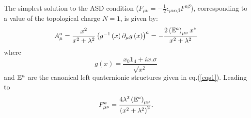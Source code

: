 \documentclass[a4paper,12pt]{book}
\begin{document}
The simplest solution to the ASD condition ($F_{\mu \nu }=-\frac{1}{2}%
\epsilon _{\mu \nu \alpha \beta }F^{\alpha \beta }$), corresponding to a
value of the topological charge $N=1$, \cite{bpst}\cite{hooft1} is given by: 
\begin{equation}
A_{\mu }^{a}=\frac{x^{2}}{x^{2}+\lambda ^{2}}\left( g^{-1}\left( x\right)
\partial _{\mu }g\left( x\right) \right) ^{a}=-\frac{2\left( \Bbb{E}%
^{a}\right) _{\mu \nu }x^{\nu }}{x^{2}+\lambda ^{2}}
\end{equation}
where 
\begin{equation}
g\left( x\right) =\frac{x_{0}\mathbf{1}_{4}+ix.\sigma }{\sqrt{x^{2}}}
\end{equation}
and $\Bbb{E}^{a}$ are the canonical left quaternionic structures given in
eq.(\ref{cqs1}). Leading to 
\begin{equation}
F_{\mu \nu }^{a}=\frac{4\lambda ^{2}\left( \Bbb{E}^{a}\right) _{\mu \nu }}{%
\left( x^{2}+\lambda ^{2}\right) ^{2}}.
\end{equation}
\end{document}
